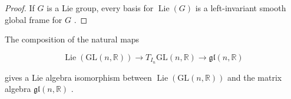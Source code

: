 \begin{proof}
\leanok
If $G$ is a Lie group, every basis for $\operatorname{Lie}\left( G\right)$ is a left-invariant smooth global frame for $G$ .
\end{proof}

\begin{proposition}
\label{prop:8-41}
\leanok
{}
The composition of the natural maps

\[
\operatorname{Lie}\left( {\mathrm{{GL}}\left( {n,\mathbb{R}}\right) }\right)  \rightarrow  {T}_{{I}_{n}}\mathrm{{GL}}\left( {n,\mathbb{R}}\right)  \rightarrow  \mathfrak{{gl}}\left( {n,\mathbb{R}}\right) \tag{8.14}
\]

gives a Lie algebra isomorphism between $\operatorname{Lie}\left( {\mathrm{{GL}}\left( {n,\mathbb{R}}\right) }\right)$ and the matrix algebra $\mathfrak{{gl}}\left( {n,\mathbb{R}}\right)$ .
\end{proposition}

